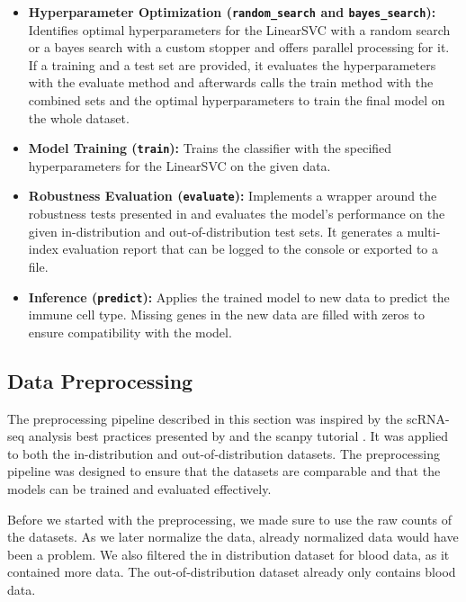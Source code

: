 \documentclass[11pt]{article}
\begin{document}
\begin{itemize}
    \item \textbf{Hyperparameter Optimization (\texttt{random\_search} and \texttt{bayes\_search}):} Identifies optimal hyperparameters for the LinearSVC with a random search or a bayes search with a custom stopper and offers parallel processing for it. If a training and a test set are provided, it evaluates the hyperparameters with the evaluate method and afterwards calls the train method with the combined sets and the optimal hyperparameters to train the final model on the whole dataset.
    \item \textbf{Model Training (\texttt{train}):} Trains the classifier with the specified hyperparameters for the LinearSVC on the given data.
    \item \textbf{Robustness Evaluation (\texttt{evaluate}):} Implements a wrapper around the robustness tests presented in  and evaluates the model's performance on the given in-distribution and out-of-distribution test sets. It generates a multi-index evaluation report that can be logged to the console or exported to a file.
    \item \textbf{Inference (\texttt{predict}):} Applies the trained model to new data to predict the immune cell type. Missing genes in the new data are filled with zeros to ensure compatibility with the model.
\end{itemize}


\subsection{Data Preprocessing}\label{sec:methods:data-preprocessing}

The preprocessing pipeline described in this section was inspired by the scRNA-seq analysis best practices presented by \textcite{luecken_current_2019} and the scanpy tutorial \cite{scanpy_development_team_preprocessing_2026}.
It was applied to both the in-distribution and out-of-distribution datasets. The preprocessing pipeline was designed to ensure that the datasets are comparable and that the models can be trained and evaluated effectively.

Before we started with the preprocessing, we made sure to use the raw counts of the datasets. As we later normalize the data, already normalized data would have been a problem. We also filtered the in distribution dataset for blood data, as it contained more data. The out-of-distribution dataset already only contains blood data.
\end{document}
